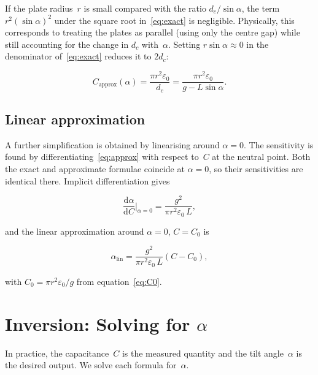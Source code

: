 \documentclass[11pt,a4paper]{article}
\begin{document}
If the plate radius~$r$ is small compared with the ratio $d_c/\sin\alpha$,
the term $r^2(\sin\alpha)^2$ under the square root in~\eqref{eq:exact} is
negligible.  Physically, this corresponds to treating the plates as
parallel (using only the centre gap) while still accounting for the
change in $d_c$ with~$\alpha$.  Setting $r\sin\alpha \approx 0$ in the
denominator of~\eqref{eq:exact} reduces it to $2d_c$:

\begin{equation}
  \boxed{C_{\text{approx}}(\alpha) = \frac{\pi r^2 \varepsilon_0}{d_c}
         = \frac{\pi r^2 \varepsilon_0}{g - L\sin\alpha}.}
  \label{eq:approx}
\end{equation}

\subsection{Linear approximation}

A further simplification is obtained by linearising around $\alpha = 0$.
The sensitivity is found by differentiating~\eqref{eq:approx} with respect
to~$C$ at the neutral point.  Both the exact and approximate formulae
coincide at $\alpha = 0$, so their sensitivities are identical there.
Implicit differentiation gives

\begin{equation}
  \frac{\mathrm{d}\alpha}{\mathrm{d}C}\bigg|_{\alpha=0}
  = \frac{g^2}{\pi r^2 \varepsilon_0\, L},
\end{equation}

and the linear approximation around $\alpha = 0$, $C = C_0$ is

\begin{equation}
  \boxed{\alpha_{\text{lin}} = \frac{g^2}{\pi r^2 \varepsilon_0\, L}
         \!\left(C - C_0\right),}
  \label{eq:linear}
\end{equation}

with $C_0 = \pi r^2 \varepsilon_0 / g$ from equation~\eqref{eq:C0}.

\section{Inversion: Solving for \texorpdfstring{$\alpha$}{alpha}}

In practice, the capacitance~$C$ is the measured quantity and the tilt
angle~$\alpha$ is the desired output.  We solve each formula for~$\alpha$.
\end{document}

